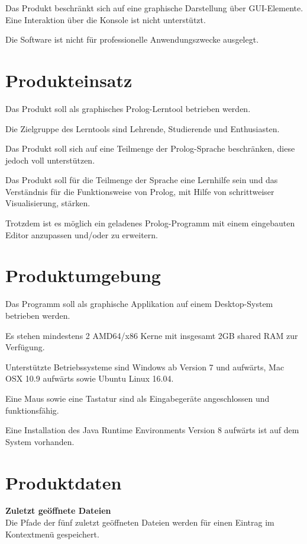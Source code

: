 \documentclass[parskip=full,11pt,twoside]{scrartcl}
\begin{document}
Das Produkt beschränkt sich auf eine graphische Darstellung über GUI-Elemente. Eine Interaktion über die Konsole ist nicht unterstützt.


Die Software ist nicht für professionelle Anwendungszwecke ausgelegt.

\pagebreak
\section{Produkteinsatz}

Das Produkt soll als graphisches Prolog-Lerntool betrieben werden.

Die Zielgruppe des Lerntools sind Lehrende, Studierende und Enthusiasten.

Das Produkt soll sich auf eine Teilmenge der Prolog-Sprache beschränken, diese jedoch voll unterstützen.

Das Produkt soll für die Teilmenge der Sprache eine Lernhilfe sein und das Verständnis für die Funktionsweise von Prolog, mit Hilfe von schrittweiser Visualisierung, stärken.

Trotzdem ist es möglich ein geladenes Prolog-Programm mit einem eingebauten Editor anzupassen und/oder zu erweitern.

\section{Produktumgebung}

Das Programm soll als graphische Applikation auf einem Desktop-System betrieben werden.

Es stehen mindestens 2 AMD64/x86 Kerne mit insgesamt 2GB shared RAM zur Verfügung.

Unterstützte Betriebssysteme sind Windows ab Version 7 und aufwärts, Mac OSX 10.9 aufwärts sowie Ubuntu Linux 16.04.

Eine Maus sowie eine Tastatur sind als Eingabegeräte angeschlossen und funktionsfähig.

Eine Installation des Java Runtime Environments Version 8 aufwärts ist auf dem System vorhanden.

\newpage

\section{Produktdaten}

\textbf{Zuletzt geöffnete Dateien} \\
Die Pfade der fünf zuletzt geöffneten Dateien werden für einen Eintrag im Kontextmenü gespeichert.
\end{document}
